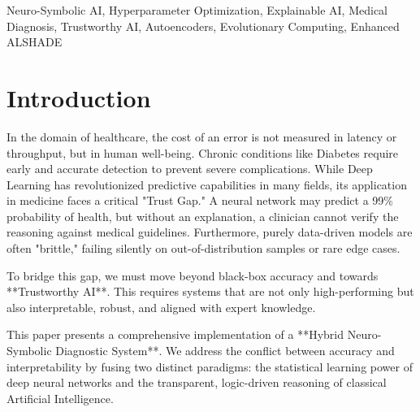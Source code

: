 \documentclass[conference]{IEEEtran}
\begin{document}
\begin{IEEEkeywords}
Neuro-Symbolic AI, Hyperparameter Optimization, Explainable AI, Medical Diagnosis, Trustworthy AI, Autoencoders, Evolutionary Computing, Enhanced ALSHADE
\end{IEEEkeywords}

\section{Introduction}
In the domain of healthcare, the cost of an error is not measured in latency or throughput, but in human well-being. Chronic conditions like Diabetes require early and accurate detection to prevent severe complications. While Deep Learning has revolutionized predictive capabilities in many fields, its application in medicine faces a critical "Trust Gap." A neural network may predict a 99\% probability of health, but without an explanation, a clinician cannot verify the reasoning against medical guidelines. Furthermore, purely data-driven models are often "brittle," failing silently on out-of-distribution samples or rare edge cases.

To bridge this gap, we must move beyond black-box accuracy and towards **Trustworthy AI**. This requires systems that are not only high-performing but also interpretable, robust, and aligned with expert knowledge.

This paper presents a comprehensive implementation of a **Hybrid Neuro-Symbolic Diagnostic System**. We address the conflict between accuracy and interpretability by fusing two distinct paradigms: the statistical learning power of deep neural networks and the transparent, logic-driven reasoning of classical Artificial Intelligence.
\end{document}
